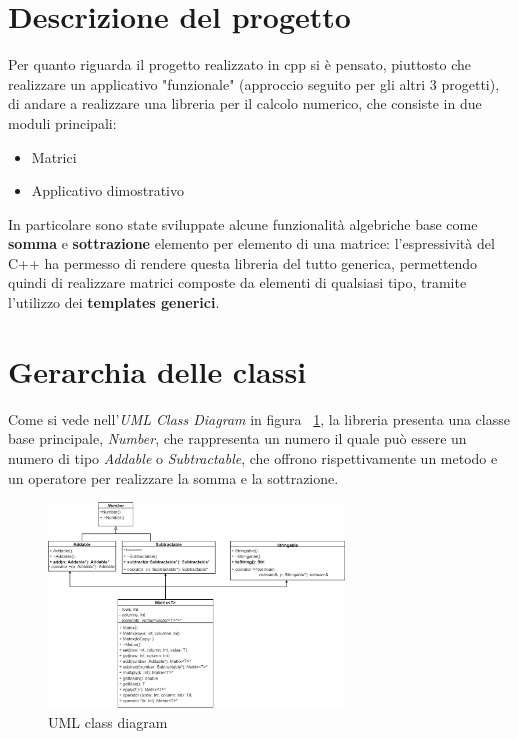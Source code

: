 \section{Descrizione del progetto}
Per quanto riguarda il progetto realizzato in cpp si è pensato, piuttosto che realizzare un applicativo "funzionale" (approccio seguito per gli altri 3 progetti), di andare a realizzare una libreria per il calcolo numerico, che consiste in due moduli principali:
\begin{itemize}
	\item Matrici
	\item Applicativo dimostrativo
\end{itemize}

In particolare sono state sviluppate alcune funzionalità algebriche base come \textbf{somma} e \textbf{sottrazione} elemento per elemento di una matrice: l'espressività del C++ ha permesso di rendere questa libreria del tutto generica, permettendo quindi di realizzare matrici composte da elementi di qualsiasi tipo, tramite l'utilizzo dei \textbf{templates generici}.

\section{Gerarchia delle classi}
Come si vede nell'\textit{UML Class Diagram} in figura ~\ref{fig:UMLClassDiagram}, la libreria presenta una classe base principale, \textit{Number}, che rappresenta un numero il quale può essere un numero di tipo \textit{Addable} o \textit{Subtractable}, che offrono rispettivamente un metodo e un operatore per realizzare la somma e la sottrazione.
\begin{figure}[h]
	\centering
	\includegraphics[width=0.7\textwidth]{Immagini/ClassDiagram.jpg}
	\caption{UML class diagram}
	\label{fig:UMLClassDiagram}
\end{figure}

